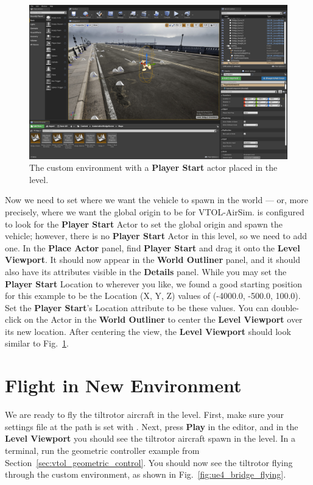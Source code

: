 \begin{figure}[t]
    \centering
    \includegraphics[width=\textwidth]{figures/ue4_bridge_playerstart}
    \caption[Custom environment in Unreal Editor]{
        The custom environment with a \textbf{Player Start} actor placed in the level.}%
    \label{fig:ue4_bridge_playerstart}
\end{figure}

Now we need to set where we want the vehicle to spawn in the world --- or, more precisely, where we want the global origin to be for VTOL-AirSim.  is configured to look for the \textbf{Player Start} Actor to set the global origin and spawn the vehicle; however, there is no \textbf{Player Start} Actor in this level, so we need to add one. In the \textbf{Place Actor} panel, find \textbf{Player Start} and drag it onto the \textbf{Level Viewport}. It should now appear in the \textbf{World Outliner} panel, and it should also have its attributes visible in the \textbf{Details} panel. While you may set the \textbf{Player Start} Location to wherever you like, we found a good starting position for this example to be the Location (X, Y, Z) values of (-4000.0, -500.0, 100.0). Set the \textbf{Player Start}'s Location attribute to be these values. You can double-click on the  Actor in the \textbf{World Outliner} to center the \textbf{Level Viewport} over its new location. After centering the view, the \textbf{Level Viewport} should look similar to Fig.~\ref{fig:ue4_bridge_playerstart}.

\section{Flight in New Environment}
We are ready to fly the tiltrotor aircraft in the level. First, make sure your settings file at the path  is set with . Next, press \textbf{Play} in the editor, and in the \textbf{Level Viewport} you should see the tiltrotor aircraft spawn in the level. In a terminal, run the geometric controller example from Section~\ref{sec:vtol_geometric_control}. You should now see the tiltrotor flying through the custom environment, as shown in Fig.~\ref{fig:ue4_bridge_flying}.

